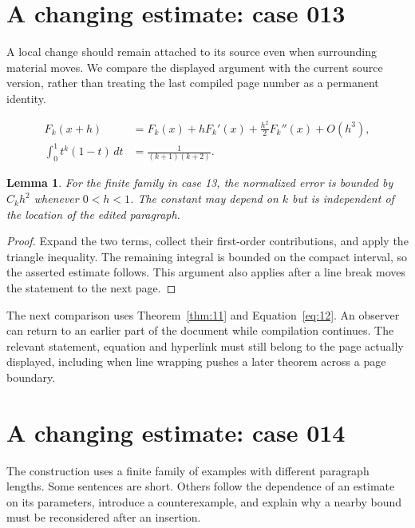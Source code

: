 \documentclass[a4paper,10pt]{article}
\newtheorem{lemma}[theorem]{Lemma}
\begin{document}
\lipsum[8]

\section{A changing estimate: case 013}\label{unit:12}
A local change should remain attached to its source even when surrounding material moves. We compare the displayed argument with the current source version, rather than treating the last compiled page number as a permanent identity.

\lipsum[7-8]
\begin{align}\label{eq:12}
 F_k(x+h)&=F_k(x)+hF_k'(x)+\frac{h^2}{2}F_k''(x)+O(h^3),\\
 \int_0^1 t^k(1-t)\,dt&=\frac{1}{(k+1)(k+2)}.
\end{align}
\begin{lemma}\label{thm:12}
For the finite family in case 13, the normalized error is bounded by $C_k h^2$ whenever $0<h<1$. The constant may depend on $k$ but is independent of the location of the edited paragraph.
\end{lemma}
\begin{proof}
Expand the two terms, collect their first-order contributions, and apply the
triangle inequality. The remaining integral is bounded on the compact interval,
so the asserted estimate follows. This argument also applies after a line break
moves the statement to the next page.
\end{proof}
The next comparison uses Theorem~\ref{thm:11} and Equation~\ref{eq:12}. An observer can return to an earlier part of the document while compilation continues. The relevant statement, equation and hyperlink must still belong to the page actually displayed, including when line wrapping pushes a later theorem across a page boundary.

\lipsum[13]

\section{A changing estimate: case 014}\label{unit:13}
The construction uses a finite family of examples with different paragraph lengths. Some sentences are short. Others follow the dependence of an estimate on its parameters, introduce a counterexample, and explain why a nearby bound must be reconsidered after an insertion.
\end{document}
